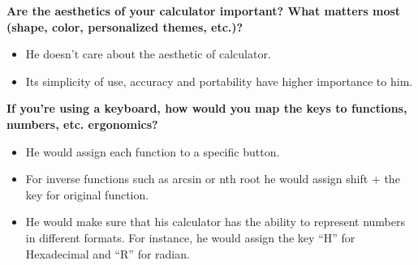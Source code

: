 \documentclass{article}
\begin{document}
\textbf{Are the aesthetics of your calculator important? What matters most (shape, color,  personalized themes, etc.)?}
\begin{itemize}
\itemsep0em 
\item He doesn't care about the aesthetic of calculator.
\item Its simplicity of use, accuracy and portability have higher importance to him.
\end{itemize}

\textbf{If you’re using a keyboard, how would you map the keys to functions, numbers, etc. ergonomics?}
\begin{itemize}
\itemsep0em 
\item He would assign each function to a specific button. 
\item For inverse functions such as arcsin or nth root he would assign shift + the key for original function. 
\item He would make sure that his calculator has the ability to represent numbers in different formats. For instance, he would assign the key “H” for Hexadecimal and “R” for radian.  
\end{itemize}
\pagebreak
\end{document}

